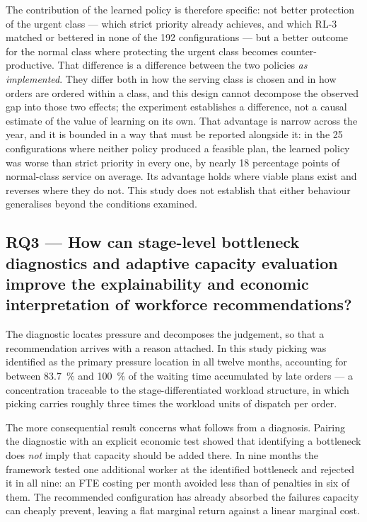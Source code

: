 The contribution of the learned policy is therefore specific: not better protection of the
urgent class --- which strict priority already achieves, and which RL-3 matched or bettered in
none of the 192 configurations --- but a better outcome for the normal class where protecting
the urgent class becomes counter-productive. That difference is a difference between the two
policies \emph{as implemented}. They differ both in how the serving class is chosen and in how
orders are ordered within a class, and this design cannot decompose the observed gap into those
two effects; the experiment establishes a difference, not a causal estimate of the value of
learning on its own. That advantage is narrow across the year, and it is bounded in a way that
must be reported alongside it: in the 25 configurations where neither policy produced a feasible
plan, the learned policy was worse than strict priority in every one, by nearly 18 percentage
points of normal-class service on average. Its advantage holds where viable plans exist and
reverses where they do not. This study does not establish that either behaviour generalises
beyond the conditions examined.

\subsection*{RQ3 --- How can stage-level bottleneck diagnostics and adaptive capacity evaluation
improve the explainability and economic interpretation of workforce recommendations?}

The diagnostic locates pressure and decomposes the judgement, so that a recommendation arrives
with a reason attached. In this study picking was identified as the primary pressure location in
all twelve months, accounting for between \SI{83.7}{\percent} and \SI{100}{\percent} of the
waiting time accumulated by late orders --- a concentration traceable to the stage-differentiated
workload structure, in which picking carries roughly three times the workload units of dispatch
per order.

The more consequential result concerns what follows from a diagnosis. Pairing the diagnostic
with an explicit economic test showed that identifying a bottleneck does \emph{not} imply that
capacity should be added there. In nine months the framework tested one additional worker at the
identified bottleneck and rejected it in all nine: an FTE costing  per month avoided
less than  of penalties in six of them. The recommended configuration has already
absorbed the failures capacity can cheaply prevent, leaving a flat marginal return against a
linear marginal cost.

